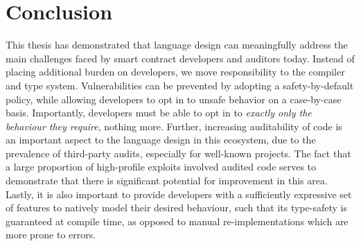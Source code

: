 \chapter{Conclusion}\label{ch:conclusion}

This thesis has demonstrated that language design can meaningfully address the main challenges faced by smart contract developers and auditors today. Instead of placing additional burden on developers, we move responsibility to the compiler and type system. Vulnerabilities can be prevented by adopting a safety-by-default policy, while allowing developers to opt in to unsafe behavior on a case-by-case basis. Importantly, developers must be able to opt in to \textit{exactly only the behaviour they require}, nothing more. Further, increasing auditability of code is an important aspect to the language design in this ecosystem, due to the prevalence of third-party audits, especially for well-known projects. The fact that a large proportion of high-profile exploits involved audited code serves to demonstrate that there is significant potential for improvement in this area. Lastly, it is also important to provide developers with a sufficiently expressive set of features to natively model their desired behaviour, such that its type-safety is guaranteed at compile time, as opposed to manual re-implementations which are more prone to errors.

